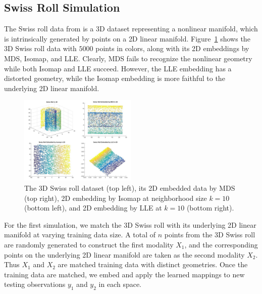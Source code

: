 \documentclass[times,twocolumn,final]{elsarticle}
\begin{document}
\subsection{Swiss Roll Simulation}
The Swiss roll data from \citep{TenenbaumSilvaLangford2000} is a 3D dataset representing a nonlinear manifold, which is intrinsically generated by points on a 2D linear manifold. Figure~\ref{fig1} shows the 3D Swiss roll data with $5000$ points in colors, along with its 2D embeddings by MDS, Isomap, and LLE. Clearly, MDS fails to recognize the nonlinear geometry while both Isomap and LLE succeed. However, the LLE embedding has a distorted geometry, while the Isomap embedding is more faithful to the underlying 2D linear manifold.

\begin{figure}[htbp]
\centering
\includegraphics[width=0.5\textwidth]{Swiss.png}
\caption{The 3D Swiss roll dataset (top left), its 2D embedded data by MDS (top right), 2D embedding by Isomap at neighborhood size $k=10$ (bottom left), and 2D embedding by LLE at $k=10$ (bottom right).}
\label{fig1}
\end{figure}

For the first simulation, we match the 3D Swiss roll with its underlying 2D linear manifold at varying training data size. A total of $n$ points from the 3D Swiss roll are randomly generated to construct the first modality $X_{1}$, and the corresponding points on the underlying 2D linear manifold are taken as the second modality $X_{2}$. Thus $X_{1}$ and $X_{2}$ are matched training data with distinct geometries. Once the training data are matched, we embed and apply the learned mappings to new testing observations $y_{1}$ and $y_{2}$ in each space.
\end{document}
